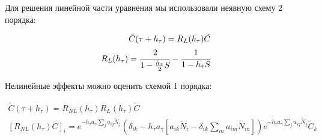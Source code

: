 Для решения линейной части уравнения мы использовали неявную схему 2 порядка:

\begin{equation}
\begin{split}
	\tilde{C}(\tau + h_{\tau}) = R_L(h_{\tau}) \tilde{C} \\
	R_L(h_{\tau}) = \cfrac{2}{1 - \frac{h_{\tau}}{2}S} - \cfrac{1}{1 - h_{\tau}S}
\end{split}
\end{equation}

Нелинейные эффекты можно оценить схемой 1 порядка:

\begin{equation}
	\begin{split}
		\tilde{C}(\tau + h_{\tau}) = R_{NL}(h_{\tau}) R_L(h_{\tau}) \tilde{C} \\
		[R_{NL}(h_{\tau}) C]_i = e^{-h_{\tau} a_{\gamma} \sum_j{a_{ij}\tilde{N}_j} } (\delta_{ik} - h_{\tau} a_{\gamma} [a_{ik}\tilde{N}_i - \delta_{ik}\sum_{m}{a_{im}\tilde{N}_m}])
		e^{-h_{\tau} a_{\gamma} \sum_j{a_{kj}\tilde{N}_j} } \tilde{C}_k
	\end{split}
\end{equation}




